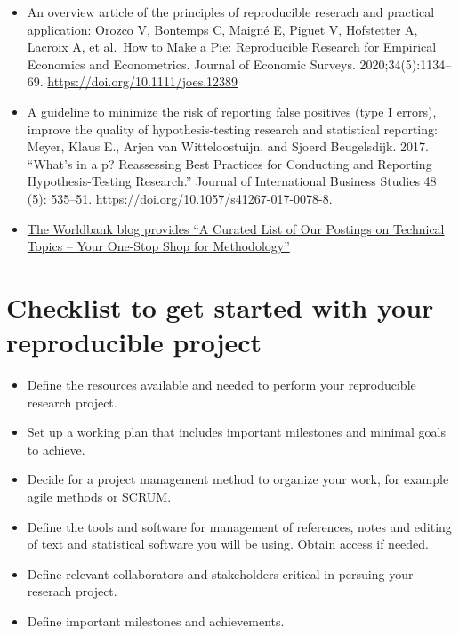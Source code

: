 \documentclass[
]{book}
\providecommand{\tightlist}{%
  \setlength{\itemsep}{0pt}\setlength{\parskip}{0pt}}
\begin{document}
\begin{itemize}
\item
  An overview article of the principles of reproducible reserach and
  practical application: Orozco V, Bontemps C, Maigné E, Piguet V,
  Hofstetter A, Lacroix A, et al.~How to Make a Pie: Reproducible
  Research for Empirical Economics and Econometrics. Journal of Economic
  Surveys. 2020;34(5):1134--69. \url{https://doi.org/10.1111/joes.12389}
\item
  A guideline to minimize the risk of reporting false positives (type I
  errors), improve the quality of hypothesis-testing research and
  statistical reporting: Meyer, Klaus E., Arjen van Witteloostuijn, and
  Sjoerd Beugelsdijk. 2017. ``What's in a p? Reassessing Best Practices
  for Conducting and Reporting Hypothesis-Testing Research.'' Journal of
  International Business Studies 48 (5): 535--51.
  \url{https://doi.org/10.1057/s41267-017-0078-8}.
\item
  \href{https://blogs.worldbank.org/impactevaluations/curated-list-our-postings-technical-topics-your-one-stop-shop-methodology-0}{The
  Worldbank blog provides ``A Curated List of Our Postings on Technical
  Topics -- Your One-Stop Shop for Methodology''}
\end{itemize}

\hypertarget{checklist-to-get-started-with-your-reproducible-project}{%
\section{Checklist to get started with your reproducible
project}\label{checklist-to-get-started-with-your-reproducible-project}}

\begin{itemize}
\tightlist
\item
  Define the resources available and needed to perform your reproducible
  research project.
\item
  Set up a working plan that includes important milestones and minimal
  goals to achieve.
\item
  Decide for a project management method to organize your work, for
  example agile methods or SCRUM.
\item
  Define the tools and software for management of references, notes and
  editing of text and statistical software you will be using. Obtain
  access if needed.
\item
  Define relevant collaborators and stakeholders critical in persuing
  your reserach project.
\item
  Define important milestones and achievements.
\end{itemize}
\end{document}
